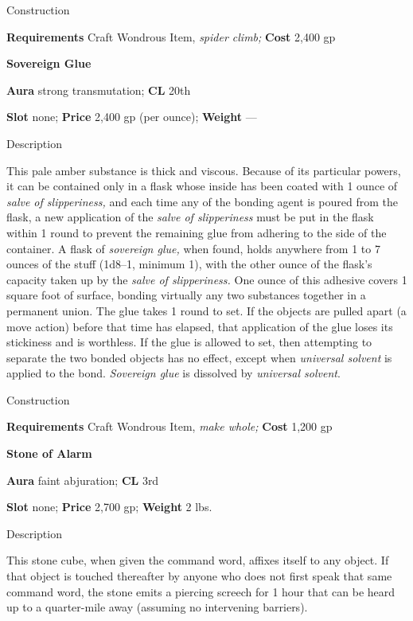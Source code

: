 Construction
				
\textbf{Requirements} Craft Wondrous Item,\textit{ spider climb;}\textbf{ Cost }2,400 gp
				
\textbf{Sovereign Glue}
				
\textbf{Aura} strong transmutation;\textbf{ CL }20th
				
\textbf{Slot} none; \textbf{Price} 2,400 gp (per ounce); \textbf{Weight }---
				
Description
				
This pale amber substance is thick and viscous. Because of its particular powers, it can be contained only in a flask whose inside has been coated with 1 ounce of \textit{salve of slipperiness,} and each time any of the bonding agent is poured from the flask, a new application of the \textit{salve of slipperiness} must be put in the flask within 1 round to prevent the remaining glue from adhering to the side of the container. A flask of \textit{sovereign glue,} when found, holds anywhere from 1 to 7 ounces of the stuff (1d8--1, minimum 1), with the other ounce of the flask's capacity taken up by the \textit{salve of slipperiness.} One ounce of this adhesive covers 1 square foot of surface, bonding virtually any two substances together in a permanent union. The glue takes 1 round to set. If the objects are pulled apart (a move action) before that time has elapsed, that application of the glue loses its stickiness and is worthless. If the glue is allowed to set, then attempting to separate the two bonded objects has no effect, except when \textit{universal solvent} is applied to the bond. \textit{Sovereign glue }is dissolved by \textit{universal solvent}.
				
Construction
				
\textbf{Requirements} Craft Wondrous Item,\textit{ make whole;}\textbf{ Cost }1,200 gp
				
\textbf{Stone of Alarm}
				
\textbf{Aura} faint abjuration;\textbf{ CL }3rd
				
\textbf{Slot} none; \textbf{Price} 2,700 gp; \textbf{Weight} 2 lbs.
				
Description
				
This stone cube, when given the command word, affixes itself to any object. If that object is touched thereafter by anyone who does not first speak that same command word, the stone emits a piercing screech for 1 hour that can be heard up to a quarter-mile away (assuming no intervening barriers). 
				
